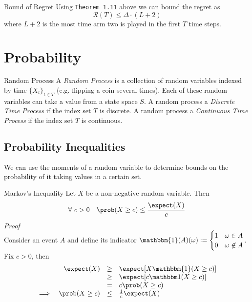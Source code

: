 \documentclass[11pt,a4paper]{article}
\begin{document}
\begin{proposition}{Bound of Regret}
  Using \texttt{Theorem 1.11}  above we can bound the regret as
  \[ \mathcal{R}(T)\leq\Delta\cdot(L+2) \]
  where $L+2$ is the most time arm two is played in the first $T$ time steps.
\end{proposition}

\section{Probability}

\begin{definition}{Random Process}
  A \textit{Random Process} is a collection of random variables indexed by time $\{X_t\}_{t\in T}$ (e.g. flipping a coin several times). Each of these random variables can take a value from a state space $S$. A random process a \textit{Discrete Time Process} if the index set $T$ is discrete. A random process a \textit{Continuous Time Process} if the index set $T$ is continuous.
\end{definition}

\subsection{Probability Inequalities}

\begin{remark}{We can use the moments of a random variable to determine bounds on the probability of it taking values in a certain set.}
\end{remark}

\begin{theorem}{Markov's Inequality}
  Let $X$ be a non-negative random variable. Then
  \[ \forall\ c>0\quad\prob(X\geq c)\leq\frac{\expect(X)}c \]
  \textit{Proof}\\
  Consider an event $A$ and define its indicator $\mathbbm{1}(A)(\omega):=\begin{cases}1&\omega\in A\\0&\omega\not\in A\end{cases}$. Fix $c>0$, then
  \[\begin{array}{rrcl}
    &\expect(X)&\geq&\expect[X\mathbbm{1}(X\geq c)]\\
    &&\geq&\expect[c\mathbbm1(X\geq c)]\\
    &&=&c\prob(X\geq c)\\
    \implies&\prob(X\geq c)&\leq&\frac1c\expect(X)
  \end{array}\]
\end{theorem}
\end{document}
